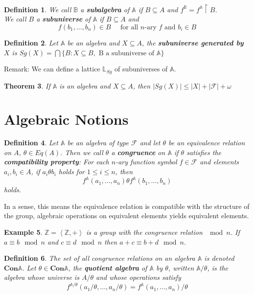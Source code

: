 \documentclass[12pt,a4paper]{article}
\newtheorem{theorem}{Theorem}[section]
\newtheorem{example}[theorem]{Example}
\newtheorem{definition}[theorem]{Definition}
\begin{document}
\begin{definition}
We call $\mathbb{B}$ a \textbf{subalgebra} of $\mathbb{A}$ if $B\subseteq A$ and $f^\mathbb{B}=f^\mathbb{A}\upharpoonright B$.\\
We call $B$ a \textbf{subuniverse} of $\mathbb{A}$ if $B\subseteq A$ and 
\[
f(b_1,\ldots,b_n)\in B  \;\;\;\;\; \text{for all } n\text{-ary } f \text{ and } b_i\in B
\]
\end{definition}

\begin{definition}
Let $\mathbb{A}$ be an algebra and $X\subseteq A$, the \textbf{subuniverse generated by } $X$ is $Sg(X)=\bigcap\{B:X\subseteq B, \text{ B a subuniverse of } \mathbb{A}\}$
\end{definition}
Remark: We can define a lattice $\mathbb{L}_{Sg}$ of subuniverses of $\mathbb{A}$.

\begin{theorem}
If $\mathbb{A}$ is an algebra and $X\subseteq A$, then $|Sg(X)|\le |X|+|\mathcal{F}|+\omega$
\end{theorem}

\section{Algebraic Notions}

\begin{definition}
Let $\mathbb{A}$ be an algebra of type $\mathcal{F}$ and let $\theta$ be an equivalence relation on $A$, $\theta\in Eq(A)$. Then we call $\theta$ a \textbf{congruence} on $\mathbb{A}$ if $\theta$ satisfies the \textbf{compatibility property}: For each $n$-ary function symbol $f\in\mathcal{F}$ and elements $a_i,b_i\in A$, if $a_i\theta b_i$ holds for $1\le i\le n$, then 
\[
f^\mathbb{A}(a_1,\ldots,a_n)\theta f^\mathbb{A}(b_1,\ldots,b_n)
\]
holds.
\end{definition}

In a sense, this means the equivalence relation is compatible with the structure of the group, algebraic operations on equivalent elements yields equivalent elements.

\begin{example}
$\mathbb{Z}=\left<\mathbb{Z},+\right>$ is a group with the congruence relation $\mod n$. If $a\equiv b \mod n$ and $c\equiv d\mod n$ then $a+c\equiv b+d\mod n$.
\end{example}

\begin{definition} The set of all congruence relations on an algebra $\mathbb{A}$ is denoted $\mathbf{Con}\mathbb{A}$. Let $\theta\in\mathbf{Con}\mathbb{A}$, the \textbf{quotient algebra} of $\mathbb{A}$ by $\theta$, written $\mathbb{A}/\theta$, is the algebra whose universe is $A/\theta$ and whose operations satisfy 
\[
f^{\mathbb{A}/\theta}(a_1/\theta,\ldots,a_n/\theta)=f^{\mathbb{A}}(a_1,\ldots,a_n)/\theta
\]
\end{definition}
\end{document}
